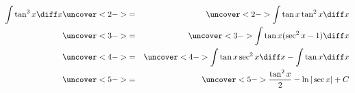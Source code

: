 \begin{frame}
\begin{example} %
\begin{eqnarray*}
\int \tan^3 x \diff x%
 & \uncover<2->{ = } & %
\uncover<2->{\int \tan x \tan^2 x \diff x}\\%
 & \uncover<3->{ = } & %
\uncover<3->{\int \tan x (\sec^2 x - 1)\diff x}\\%
 & \uncover<4->{ = } & %
\uncover<4->{\int \tan x \sec^2 x \diff x - \int \tan x \diff x}\\%
 & \uncover<5->{ = } & %
\uncover<5->{\frac{\tan^2 x}{2}  -  \ln|\sec x|  + C}\\%
\end{eqnarray*}
\end{example}
\end{frame}
